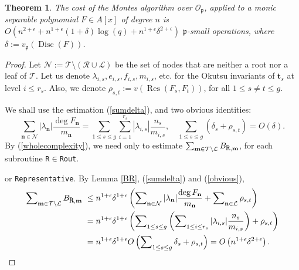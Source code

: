 \documentclass{amsart}
\newtheorem{theorem}{Theorem}[section]
\begin{document}
\begin{theorem}\label{main}
The cost of the Montes algorithm over ${\mathcal{O}}_{\mathfrak{p}}$, applied to a monic se\-pa\-rable polynomial $F\in A[x]$ of degree $n$ is
$O\left(n^{2+\epsilon}+n^{1+\epsilon}(1+\delta)\log(q)+n^{1+\epsilon}\delta^{2+\epsilon}\right)$ ${\mathfrak{p}}$-small operations, where $\delta:=v_{\mathfrak{p}}({\operatorname{Disc}}(F))$.
\end{theorem}

\begin{proof}
Let ${\mathcal{N}}:={\mathcal{T}}\setminus({\mathcal{R}}\cup{\mathcal{L}})$ be the set of nodes that are neither a root nor a leaf of ${\mathcal{T}}$. Let us denote 
 $\lambda_{i,s},e_{i,s},f_{i,s}, m_{i,s}$, etc. for the Okutsu invariants of ${\mathbf{t}}_s$ at level $i\le r_s$. Also, we denote $\rho_{s,t}:=v({\operatorname{Res}}(F_s,F_t))$, for all $1\le s\ne t\le g$. 

We shall use the estimation (\ref{sumdelta}), and two obvious identities:
\begin{equation}\label{obvious}
\sum_{{\mathbf{n}}\in{\mathcal{N}}}|\lambda_{\mathbf{n}}|\dfrac{\deg F_{\mathbf{n}}}{m_{\mathbf{n}}}=
\sum_{1\le s\le g}\sum_{i=1}^{r_s} |\lambda_{i,s}| \dfrac{n_s}{m_{i,s}},\quad
\sum_{1\le s\le g}\left(\delta_s+\rho_{s,t}\right)=O(\delta).
\end{equation}
By (\ref{wholecomplexity}), we need only to estimate $\sum\nolimits_{{\mathbf{m}} \in{\mathcal{T}}\setminus{\mathcal{L}}}B_{\mbox{\tt R},{\mathbf{m}}}$, for each subroutine {\tt R$\in$Rout}.\medskip

 or {\tt Representative}. By Lemma \ref{BR}, (\ref{sumdelta}) and (\ref{obvious}),
\begin{align*}
\sum\nolimits_{{\mathbf{m}} \in{\mathcal{T}}\setminus{\mathcal{L}}}B_{\mbox{\tt R},{\mathbf{m}}}&\ \le n^{1+\epsilon}\delta^{1+\epsilon}\left(\sum\nolimits_{{\mathbf{n}}\in{\mathcal{N}}}|\lambda_{\mathbf{n}}|\dfrac{\deg F_{\mathbf{n}}}{m_{\mathbf{n}}}+\sum\nolimits_{{\mathbf{n}}\in{\mathcal{L}}}\rho_{s,t}\right)\\
&\ =n^{1+\epsilon}\delta^{1+\epsilon}\left(\sum\nolimits_{1\le s\le g}\left(\sum\nolimits_{1\le i\le r_s} |\lambda_{i,s}| \dfrac{n_s}{m_{i,s}}\right)+\rho_{s,t}\right)\\
&\ =n^{1+\epsilon}\delta^{1+\epsilon}O\left(\sum\nolimits_{1\le s\le g}\delta_s+\rho_{s,t}\right)=O\left(n^{1+\epsilon}\delta^{2+\epsilon}\right).
\end{align*}


\end{proof}
\end{document}
